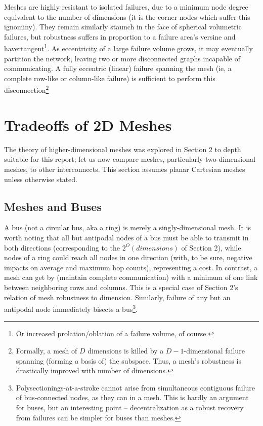 \documentclass[twocolumn]{article}
\begin{document}
Meshes are highly resistant to isolated failures, due to a minimum node degree
equivalent to the number of dimensions (it is the corner nodes which suffer
this ignominy). They remain similarly staunch in the face of spherical
volumetric failures, but robustness suffers in proportion to a failure area's
versine and havertangent\footnote{Or increased prolation/oblation of a
failure volume, of course.}. As eccentricity of a large failure volume grows, it may
eventually partition the network, leaving two or more disconnected graphs
incapable of communicating. A fully eccentric (linear) failure spanning the
mesh (ie, a complete row-like or column-like failure) is sufficient to perform
this disconnection\footnote{Formally, a mesh of $D$ dimensions is killed by a
$D-1$-dimensional failure spanning (forming a basis of) the subspace. Thus,
a mesh's robustness is drastically improved with number of dimensions.}

\section{Tradeoffs of 2D Meshes}
The theory of higher-dimensional meshes was explored in Section 2 to depth
suitable for this report; let us now compare meshes, particularly two-dimensional
meshes, to other interconnects. This section assumes planar Cartesian meshes
unless otherwise stated.
\subsection{Meshes and Buses}
A bus (not a circular bus, aka a ring) is merely a singly-dimensional mesh. It
is worth noting that all but antipodal nodes of a bus must be able to transmit
in both directions (corresponding to the $2^O(dimensions)$ of Section 2),
while nodes of a ring could reach all nodes in one direction (with, to be sure,
negative impacts on average and maximum hop counts), representing a cost. In
contrast, a mesh can get by (maintain complete communication) with a minimum of
one link between neighboring rows and columns. This is a special case of Section
2's relation of mesh robustness to dimension. Similarly, failure of any but an
antipodal node immediately bisects a bus\footnote{Polysectionings-at-a-stroke
cannot arise from simultaneous contiguous failure of bus-connected nodes, as
they can in a mesh. This is hardly an argument for buses, but an interesting
point -- decentralization as a robust recovery from failures can be simpler for
buses than meshes.}.
\end{document}
